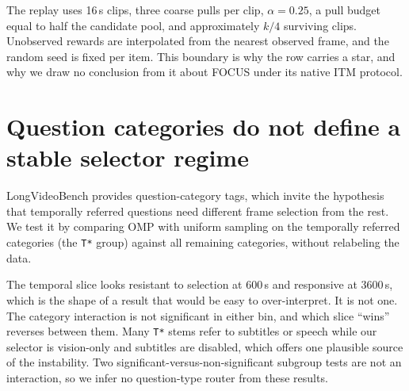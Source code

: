 \documentclass[11pt]{article}
\begin{document}
The replay uses 16\,s clips, three coarse pulls per clip, $\alpha{=}0.25$, a pull budget equal to half the candidate pool, and approximately $k/4$ surviving clips.
Unobserved rewards are interpolated from the nearest observed frame, and the random seed is fixed per item.
This boundary is why the row carries a star, and why we draw no conclusion from it about FOCUS under its native ITM protocol.

\section{Question categories do not define a stable selector regime}
\label{app:qtype}

LongVideoBench provides question-category tags, which invite the hypothesis that temporally referred questions need different frame selection from the rest.
We test it by comparing OMP with uniform sampling on the temporally referred categories (the \texttt{T*} group) against all remaining categories, without relabeling the data.

\begin{table}[h]
\centering
\small
{}
\caption{OMP minus uniform on official LongVideoBench categories. Percentage-point gains differ by duration, and the category interaction is not significant in either long bin.}
\label{tab:qtype}
\end{table}

The temporal slice looks resistant to selection at 600\,s and responsive at 3600\,s, which is the shape of a result that would be easy to over-interpret.
It is not one.
The category interaction is not significant in either bin, and which slice ``wins'' reverses between them.
Many \texttt{T*} stems refer to subtitles or speech while our selector is vision-only and subtitles are disabled, which offers one plausible source of the instability.
Two significant-versus-non-significant subgroup tests are not an interaction, so we infer no question-type router from these results.
\end{document}
